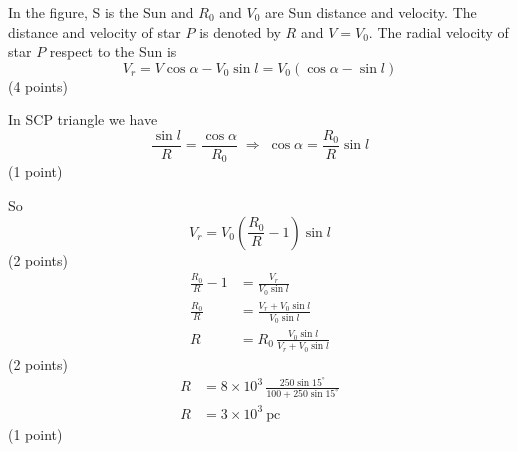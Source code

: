 In the figure, S is the Sun and $R_0$ and $V_0$ are Sun distance and velocity.
The distance and velocity of star $P$ is denoted by $R$ and $V = V_0$. The
radial velocity of star $P$ respect to the Sun is
\[
  V_r = V\cos\alpha - V_0\sin l = V_0(\cos\alpha - \sin l)
\]
\hfill(4 points)

In SCP triangle we have
\[
  \frac{\sin l}{R} = \frac{\cos\alpha}{R_0}
  \;\Rightarrow\; \cos\alpha = \frac{R_0}{R}\sin l
\]
\hfill(1 point)

So
\[
  V_r = V_0\left(\frac{R_0}{R} - 1\right)\sin l
\]
\hfill(2 points)
\begin{align*}
  \frac{R_0}{R} - 1 &= \frac{V_r}{V_0\sin l}\\
  \frac{R_0}{R} &= \frac{V_r + V_0\sin l}{V_0\sin l}\\
  R &= R_0\,\frac{V_0\sin l}{V_r + V_0\sin l}
\end{align*}
\hfill(2 points)
\begin{align*}
  R &= 8\times10^{3}\,\frac{250\sin 15^\circ}{100 + 250\sin 15^\circ}\\
  R &= 3\times10^{3}\ \mathrm{pc}
\end{align*}
\hfill(1 point)
